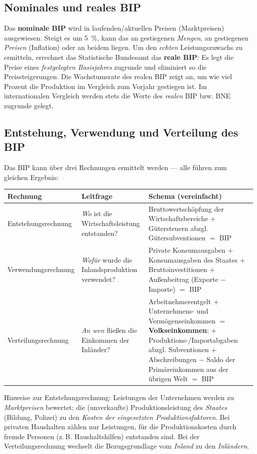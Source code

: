 \documentclass[11pt, a4paper]{article}
\begin{document}
\subsection{Nominales und reales BIP}

Das \textbf{nominale BIP} wird in laufenden/aktuellen Preisen (Marktpreisen) ausgewiesen.
Steigt es um 5~\%, kann das an gestiegenen \emph{Mengen}, an gestiegenen \emph{Preisen}
(Inflation) oder an beidem liegen. Um den \emph{echten} Leistungszuwachs zu ermitteln,
errechnet das Statistische Bundesamt das \textbf{reale BIP}: Es legt die Preise eines
\emph{festgelegten Basisjahres} zugrunde und eliminiert so die Preissteigerungen. Die
Wachstumsrate des realen BIP zeigt an, um wie viel Prozent die Produktion im Vergleich
zum Vorjahr gestiegen ist. Im internationalen Vergleich werden stets die Werte des
\emph{realen} BIP bzw. BNE zugrunde gelegt.

\subsection{Entstehung, Verwendung und Verteilung des BIP}

Das BIP kann über drei Rechnungen ermittelt werden --- alle führen zum gleichen Ergebnis:

\begin{center}
\begin{tabular}{p{3.4cm} p{4.6cm} p{6.4cm}}
\toprule
\textbf{Rechnung} & \textbf{Leitfrage} & \textbf{Schema (vereinfacht)}\\
\midrule
Entstehungs\-rechnung & \emph{Wo} ist die Wirtschaftsleistung entstanden? & Bruttowertschöpfung der Wirtschaftsbereiche $+$ Gütersteuern abzgl. Gütersubventionen $=$ BIP\\
Verwendungs\-rechnung & \emph{Wofür} wurde die Inlandsproduktion verwendet? & Private Konsumausgaben $+$ Konsumausgaben des Staates $+$ Bruttoinvestitionen $+$ Außenbeitrag (Exporte $-$ Importe) $=$ BIP\\
Verteilungs\-rechnung & \emph{An wen} fließen die Einkommen der Inländer? & Arbeitnehmerentgelt $+$ Unternehmens- und Vermögenseinkommen $=$ \textbf{Volkseinkommen}; $+$ Produktions-/Importabgaben abzgl. Subventionen $+$ Abschreibungen $-$ Saldo der Primäreinkommen aus der übrigen Welt $=$ BIP\\
\bottomrule
\end{tabular}
\end{center}

Hinweise zur Entstehungsrechnung: Leistungen der Unternehmen werden zu \emph{Marktpreisen}
bewertet; die (unverkaufte) Produktionsleistung des \emph{Staates} (Bildung, Polizei) zu
den \emph{Kosten der eingesetzten Produktionsfaktoren}. Bei privaten Haushalten zählen nur
Leistungen, für die Produktionskosten durch fremde Personen (z.\,B. Haushaltshilfen)
entstanden sind. Bei der Verteilungsrechnung wechselt die Bezugsgrundlage vom
\emph{Inland} zu den \emph{Inländern}.
\end{document}
